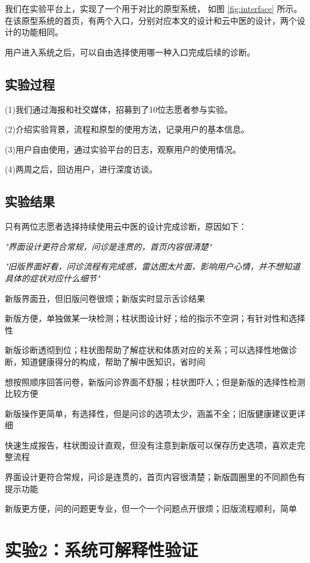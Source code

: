 我们在实验平台上，实现了一个用于对比的原型系统， 如图  \ref{fig:interface} 所示。在该原型系统的首页，有两个入口，分别对应本文的设计和云中医的设计，两个设计的功能相同。

用户进入系统之后，可以自由选择使用哪一种入口完成后续的诊断。

\subsection{实验过程}

(1)我们通过海报和社交媒体，招募到了10位志愿者参与实验。

(2)介绍实验背景，流程和原型的使用方法，记录用户的基本信息。

(3)用户自由使用，通过实验平台的日志，观察用户的使用情况。

(4)两周之后，回访用户，进行深度访谈。


\subsection{实验结果}

只有两位志愿者选择持续使用云中医的设计完成诊断，原因如下：

\textit{  "界面设计更符合常规，问诊是连贯的，首页内容很清楚"}

\textit{ "旧版界面好看，问诊流程有完成感，雷达图太片面，影响用户心情，并不想知道具体的症状对应什么细节"}

新版界面丑，但旧版问卷很烦；新版实时显示舌诊结果

新版方便，单独做某一块检测；柱状图设计好；给的指示不空洞；有针对性和选择性

新版诊断透彻到位；柱状图帮助了解症状和体质对应的关系；可以选择性地做诊断，知道健康得分的构成，帮助了解中医知识，省时间

想按照顺序回答问卷，新版问诊界面不舒服；柱状图吓人；但是新版的选择性检测比较方便

新版操作更简单，有选择性，但是问诊的选项太少，涵盖不全；旧版健康建议更详细

快速生成报告，柱状图设计直观，但没有注意到新版可以保存历史选项，喜欢走完整流程

界面设计更符合常规，问诊是连贯的，首页内容很清楚；新版圆圈里的不同颜色有提示功能

新版更方便，问的问题更专业，但一个一个问题点开很烦；旧版流程顺利，简单


\section{实验2：系统可解释性验证}

